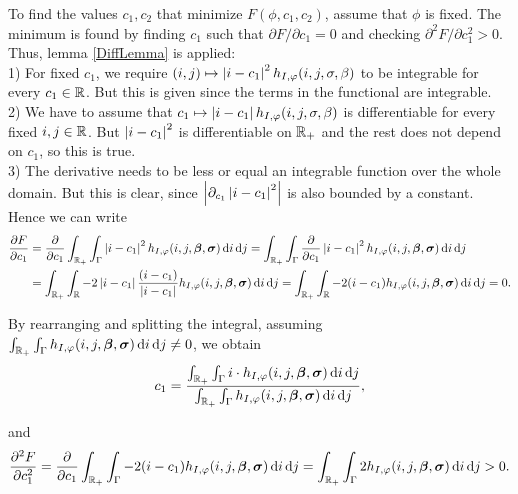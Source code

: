 To find the values $c_1,c_2$ that minimize $F(\phi,c_1,c_2)$, assume that $\phi$ is fixed. The minimum is found by finding $c_1$ such that $\partial F/\partial c_1 =0$ and checking $\partial^2 F/\partial c_1^2 > 0$. \\
Thus, lemma \ref{DiffLemma} is applied:\\
1) For fixed $c_1$, we require $(i,j)\mapsto \left| {i-c_1} \right|^2h_{I,\varphi}(i,j,\sigma,\beta)$ to be integrable for every $c_1\in\mathbb R$. But this is given since the terms in the functional are integrable.\\
2) We have to assume that  $c_1 \mapsto \left| {i-c_1} \right|h_{I,\varphi}(i,j,\sigma,\beta)$ is differentiable for every fixed $i,j\in \mathbb R$. But $\left| {i-c_1} \right|^2$ is differentiable on $\mathbb R_+$ and the rest does not depend on $c_1$, so this is true.\\
3) The derivative needs to be less or equal an integrable function over the whole domain. But this is clear, since $\left| {\partial_{c_1}\left| {i-c_1} \right|^2} \right|$ is also bounded by a constant.\\
Hence we can write
\begin{equation}
  \begin{split}
    \frac{\partial F}{\partial c_1} &= \frac{\partial }{\partial c_1} \int_{\mathbb R_+}\int_{\Gamma}\left| {i-c_1} \right|^2 h_{I,\varphi}(i,j,\boldsymbol{\beta} ,\boldsymbol{\sigma} ) \,{\rm d} i\,{\rm d} j 
    = \int_{\mathbb R_+}\int_{\Gamma}\frac{\partial }{\partial c_1}\left| {i-c_1} \right|^2 h_{I,\varphi}(i,j,\boldsymbol{\beta} ,\boldsymbol{\sigma} ) \,{\rm d} i\,{\rm d} j \\
    &= \int_{\mathbb R_+} \int_\mathbb R-2\left| {i-c_1} \right|\frac{(i-c_1)}{\left| {i-c_1} \right|} h_{I,\varphi}(i,j,\boldsymbol{\beta} ,\boldsymbol{\sigma} ) \,{\rm d} i\,{\rm d} j 
    = \int_{\mathbb R_+} \int_\mathbb R-2(i-c_1) h_{I,\varphi}(i,j,\boldsymbol{\beta} ,\boldsymbol{\sigma} ) \,{\rm d} i\,{\rm d} j = 0.
  \end{split}
\end{equation}

By rearranging and splitting the integral, assuming $\int_{\mathbb R_+}\int_{\Gamma}h_{I,\varphi}(i,j,\boldsymbol{\beta} ,\boldsymbol{\sigma} ) \,{\rm d} i\,{\rm d} j\neq 0$, we obtain
\begin{equation}
  c_1 = \frac{\int_{\mathbb R_+}  \int_{\Gamma}i\cdot h_{I,\varphi}(i,j,\boldsymbol{\beta} ,\boldsymbol{\sigma} ) \,{\rm d} i\,{\rm d} j}{\int_{\mathbb R_+}\int_{\Gamma}h_{I,\varphi}(i,j,\boldsymbol{\beta} ,\boldsymbol{\sigma} ) \,{\rm d} i\,{\rm d} j},
\end{equation}

and 
\begin{equation}
  \frac{\partial^2 F}{\partial c_1^2} = \frac{\partial}{\partial c_1}\int_{\mathbb R_+}\int_{\Gamma}-2(i-c_1) h_{I,\varphi}(i,j,\boldsymbol{\beta} ,\boldsymbol{\sigma} ) \,{\rm d} i\,{\rm d} j = \int_{\mathbb R_+}\int_{\Gamma}2 h_{I,\varphi}(i,j,\boldsymbol{\beta} ,\boldsymbol{\sigma} ) \,{\rm d} i\,{\rm d} j>0.
\end{equation}

